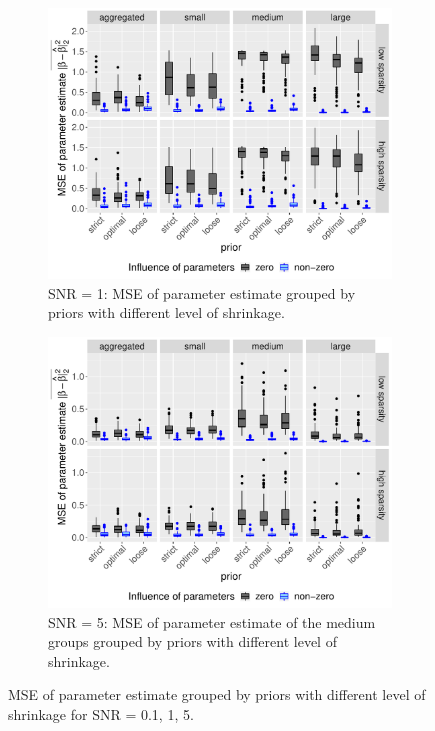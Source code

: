 \documentclass[12pt,letterpaper]{article}
\numberwithin{equation}{subsection}
\begin{document}
 \begin{figure}[hbt!]\ContinuedFloat
 \centering
\begin{subfigure}[b]{0.7\textwidth}
 \includegraphics[width=\textwidth]{../plots/lp-paramMSE2.pdf}
 \caption{SNR = 1: MSE of parameter estimate grouped by priors with different level of shrinkage.}
 \label{fig:lp-pmse-1}
 \end{subfigure}
 \begin{subfigure}[b]{0.7\textwidth}
 \includegraphics[width=\textwidth]{../plots/lp-paramMSE3.pdf}
 \caption{SNR = 5: MSE of parameter estimate of the medium groups grouped by priors with different level of shrinkage.}
 \label{fig:lp-pmse-5}
\end{subfigure} 
 \caption[MSE of parameter estimates]{MSE of parameter estimate grouped by priors with different level of shrinkage for SNR = 0.1, 1, 5.}
 \label{fig:lp-pmse}
\end{figure}
\end{document}
